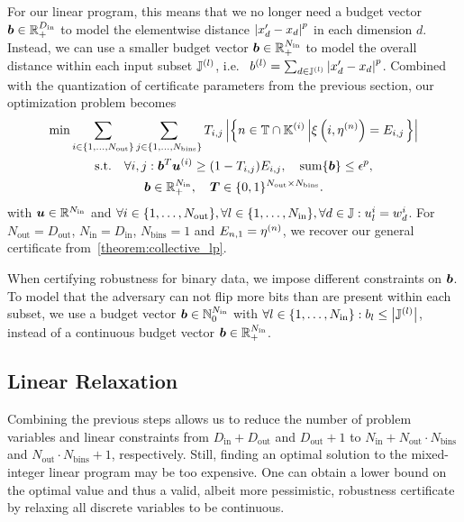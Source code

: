 For our linear program, this means that we no longer need a budget vector ${\bm{b}} \in {\mathbb{R}}_{+}^{D_\mathrm{in}}$ to model the elementwise distance $\left| {x}'_d - {x}_d \right|^p$ in each dimension $d$. Instead, we can use a smaller budget vector 
${\bm{b}} \in {\mathbb{R}}_{+}^{N_\mathrm{in}}$ to model the overall distance within each input subset ${\mathbb{J}}^{(l)}$, i.e.~
${b}^{(l)} = \sum_{d \in {\mathbb{J}}^{(l)}} \left| {x}'_d - {x}_d \right|^p$.
Combined with the quantization of certificate parameters from the previous section, our optimization problem becomes 
\begin{gather}
    \min
    \sum_{i \in \{1,\dots,N_\mathrm{out}\}} 
    \sum_{j \in \{1,\dots,N_\mathrm{bins}\}}
    {T}_{i,j}
    \left|
    \left\{
        n \in {\mathbb{T}} \cap {\mathbb{K}}^{(i)} \left| \xi\left(i, \eta^{(n)}\right) = {E}_{i,j} \right.
    \right\}
    \right|
    \\
    \text{s.t.} \quad
        \forall i, j: 
        {\bm{b}}^T {\bm{u}}^{(i)}  \geq (1 - {T}_{i,j}) {E}_{i,j}, 
    \quad
    \mathrm{sum}\{{\bm{b}}\} \leq \epsilon^p,
    \\
    {\bm{b}} \in {\mathbb{R}}_+^{N_\mathrm{in}}, \quad {\bm{T}} \in \{0,1\}^{N_\mathrm{out} \times N_\mathrm{bins}}.
\end{gather}
with ${\bm{u}} \in {\mathbb{R}}^{N_\mathrm{in}}$ and
$\forall i \in \{1,\dots,N_\mathrm{out}\}, \forall l \in \{1,\dots,N_\mathrm{in}\}, \forall d \in {\mathbb{J}}: {u}_l^{i} = {w}_d^{i}$.
For $N_\mathrm{out} = D_\mathrm{out}$, $N_\mathrm{in} = D_\mathrm{in}$, $N_\mathrm{bins}=1$ and ${E}_{n,1} = \eta^{(n)}$, we recover our general certificate from~\autoref{theorem:collective_lp}.

When certifying robustness for binary data, we impose different constraints on ${\bm{b}}$.
To model that the adversary can not flip more bits than are present within each subset, we use a budget vector 
${\bm{b}} \in {\mathbb{N}}_0^{N_\mathrm{in}}$ with $\forall l \in \{1,\dots,N_\mathrm{in}\} : {b}_l \leq \left| {\mathbb{J}}^{(l)} \right|$, instead of a continuous budget vector ${\bm{b}} \in {\mathbb{R}}_+^{N_\mathrm{in}}$.

\subsection{Linear Relaxation}\label{section:linear_relaxation}
Combining the previous steps allows us to reduce the number of problem variables and linear constraints from $D_\mathrm{in} +  D_\mathrm{out}$ and $D_\mathrm{out} + 1$ to $N_\mathrm{in} + N_\mathrm{out} \cdot N_\mathrm{bins}$ and 
$N_\mathrm{out} \cdot N_\mathrm{bins} + 1$, respectively.
Still, finding an optimal solution to the mixed-integer linear program may be too expensive.
One can obtain a lower bound on the optimal value and thus a valid, albeit more pessimistic, robustness certificate by relaxing all discrete variables to be continuous.

